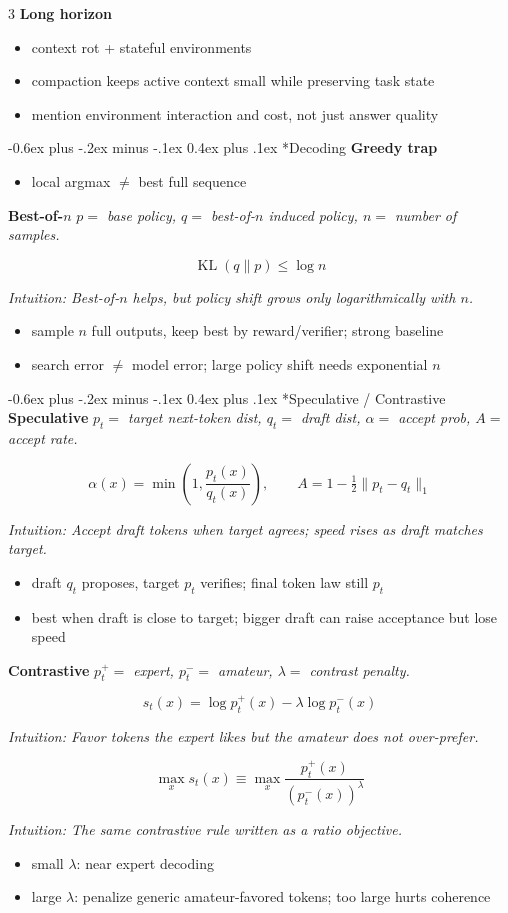 \documentclass[10pt,landscape]{article}
\makeatletter
\renewcommand{\section}{\@startsection{section}{1}{0mm}%
  {-0.6ex plus -.2ex minus -.1ex}%
  {0.4ex plus .1ex}%
  {\normalfont\normalsize\bfseries}}
\newcommand{\KL}{\operatorname{KL}}
\newcommand{\head}[1]{\section*{#1}}
\newcommand{\mini}[1]{\textbf{#1}}
\newcommand{\defs}[1]{{\emph{#1}}\par}
\newcommand{\intuition}[1]{{\scriptsize\emph{Intuition: #1}\par}}
\makeatother
\begin{document}
\begin{multicols}{3}
\mini{Long horizon}
\begin{itemize}
\item context rot + stateful environments
\item compaction keeps active context small while preserving task state
\item mention environment interaction and cost, not just answer quality
\end{itemize}

\head{Decoding}
\mini{Greedy trap}
\begin{itemize}
\item local argmax \(\neq\) best full sequence
\end{itemize}

\mini{Best-of-\(n\)}
\defs{\(p=\) base policy,\; \(q=\) best-of-\(n\) induced policy,\; \(n=\) number of samples.}
\[
\KL(q\|p)\le \log n
\]
\intuition{Best-of-\(n\) helps, but policy shift grows only logarithmically with \(n\).}
\begin{itemize}
\item sample \(n\) full outputs, keep best by reward/verifier; strong baseline
\item search error \(\neq\) model error; large policy shift needs exponential \(n\)
\end{itemize}

\head{Speculative / Contrastive}
\mini{Speculative}
\defs{\(p_t=\) target next-token dist,\; \(q_t=\) draft dist,\; \(\alpha=\) accept prob,\; \(A=\) accept rate.}
\[
\alpha(x)=\min\left(1,\frac{p_t(x)}{q_t(x)}\right),
\qquad
A=1-\tfrac{1}{2}\lVert p_t-q_t\rVert_1
\]
\intuition{Accept draft tokens when target agrees; speed rises as draft matches target.}
\begin{itemize}
\item draft \(q_t\) proposes, target \(p_t\) verifies; final token law still \(p_t\)
\item best when draft is close to target; bigger draft can raise acceptance but lose speed
\end{itemize}

\mini{Contrastive}
\defs{\(p_t^+=\) expert,\; \(p_t^-=\) amateur,\; \(\lambda=\) contrast penalty.}
\[
s_t(x)=\log p_t^+(x)-\lambda\log p_t^-(x)
\]
\intuition{Favor tokens the expert likes but the amateur does not over-prefer.}
\[
\max_x s_t(x)\equiv \max_x \frac{p_t^+(x)}{(p_t^-(x))^\lambda}
\]
\intuition{The same contrastive rule written as a ratio objective.}
\begin{itemize}
\item small \(\lambda\): near expert decoding
\item large \(\lambda\): penalize generic amateur-favored tokens; too large hurts coherence
\end{itemize}


\end{multicols}
\end{document}
